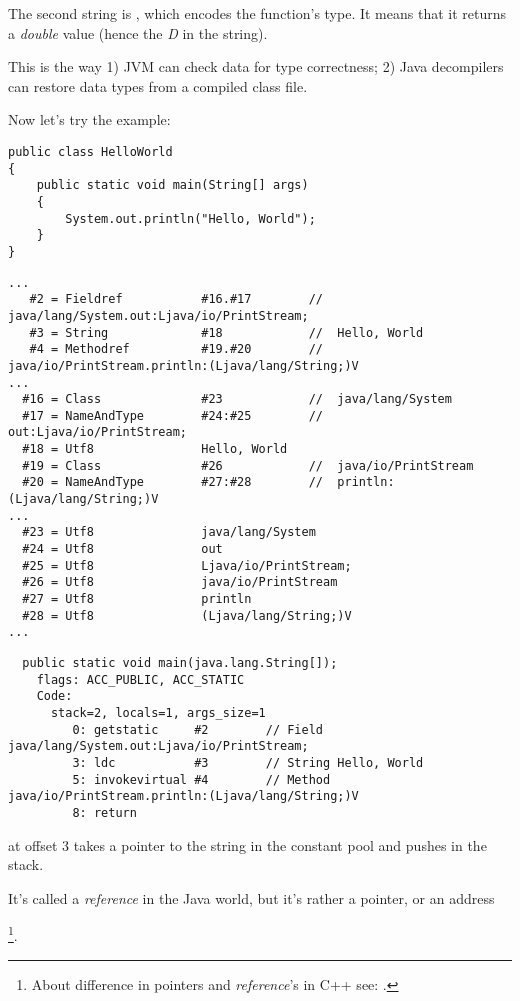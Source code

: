 The second string is , which encodes the function's type.
It means that it returns a \emph{double} value (hence the \emph{D} in the string).

This is the way 
1) JVM can check data for type correctness; 
2) Java decompilers can restore data types from a compiled class file.


Now let's try the  example:


\begin{lstlisting}[style=customjava]
public class HelloWorld
{
	public static void main(String[] args)
	{
		System.out.println("Hello, World");
	}
}
\end{lstlisting}

\begin{lstlisting}[caption=Constant pool]
...
   #2 = Fieldref           #16.#17        //  java/lang/System.out:Ljava/io/PrintStream;
   #3 = String             #18            //  Hello, World
   #4 = Methodref          #19.#20        //  java/io/PrintStream.println:(Ljava/lang/String;)V
...
  #16 = Class              #23            //  java/lang/System
  #17 = NameAndType        #24:#25        //  out:Ljava/io/PrintStream;
  #18 = Utf8               Hello, World
  #19 = Class              #26            //  java/io/PrintStream
  #20 = NameAndType        #27:#28        //  println:(Ljava/lang/String;)V
...
  #23 = Utf8               java/lang/System
  #24 = Utf8               out
  #25 = Utf8               Ljava/io/PrintStream;
  #26 = Utf8               java/io/PrintStream
  #27 = Utf8               println
  #28 = Utf8               (Ljava/lang/String;)V
...
\end{lstlisting}

\begin{lstlisting}
  public static void main(java.lang.String[]);
    flags: ACC_PUBLIC, ACC_STATIC
    Code:
      stack=2, locals=1, args_size=1
         0: getstatic     #2        // Field java/lang/System.out:Ljava/io/PrintStream;
         3: ldc           #3        // String Hello, World
         5: invokevirtual #4        // Method java/io/PrintStream.println:(Ljava/lang/String;)V
         8: return
\end{lstlisting}

 at offset 3 takes a pointer to the  string in the constant pool
and pushes in the stack.

It's called a \emph{reference} in the Java world, but it's rather a pointer, or an address

\footnote{About difference in pointers and \emph{reference}'s in C++ see: .}.

